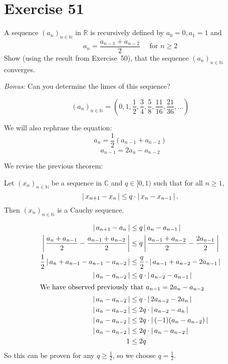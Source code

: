 \documentclass[a4paper]{article}
\theoremstyle{definition}
\newcommand\abs[1]{\left|\thinspace #1\thinspace\right|}
\newcommand\seq[1]{\left(#1\right)_{n\in\mathbb N}}
\begin{document}
\section{Exercise 51}
\begin{ex}
  A sequence $\seq{a_n}$ in $\mathbb R$ is recursively defined by $a_0 = 0, a_1 = 1$ and
  \[ a_n = \frac{a_{n-1} + a_{n-2}}{2} \quad\text{ for } n \geq 2 \]
  Show (using the result from Exercise~50), that the sequence $\seq{a_n}$ converges.

  \emph{Bonus:} Can you determine the limes of this sequence?
\end{ex}

\[ \left(a_n\right)_{n\in\mathbb N} = \left(0, 1, \frac12, \frac34, \frac58, \frac{11}{16}, \frac{21}{36}, \dots\right) \]

We will also rephrase the equation:
\[ a_n = \frac12 \left(a_{n-1} + a_{n-2}\right) \]
\[ a_{n-1} = 2a_n - a_{n-2} \]

We revise the previous theorem:

\begin{mdframed}
  Let $\seq{x_n}$ be a sequence in $\mathbb C$ and $q \in [0, 1)$ such that for all $n \geq 1$,
  \[ \abs{x_{n+1} - x_n} \leq q \cdot \abs{x_n - x_{n-1}}. \]
  Then $\seq{x_n}$ is a Cauchy sequence.
\end{mdframed}
\begin{align*}
  \abs{a_{n+1} - a_n} &\leq q \abs{a_n - a_{n-1}} \\
  \abs{\frac{a_n + a_{n-1}}{2} - \frac{a_{n-1} + a_{n-2}}{2}} &\leq q \abs{\frac{a_{n-1} + a_{n-2}}{2} - \frac{2a_{n-1}}{2}} \\
  \frac12 \abs{a_n + a_{n-1} - a_{n-1} - a_{n-2}} &\leq \frac{q}2 \cdot \abs{a_{n-1} + a_{n-2} - 2a_{n-1}} \\
  \abs{a_n - a_{n-2}} &\leq q \cdot \abs{a_{n-2} - a_{n-1}} \\
  \intertext{We have observed previously that $a_{n-1} = 2a_n - a_{n-2}$}
  \abs{a_n - a_{n-2}} &\leq q \cdot \abs{2a_{n-2} - 2a_n} \\
  \abs{a_n - a_{n-2}} &\leq 2q \cdot \abs{a_{n-2} - a_n} \\
  \abs{a_n - a_{n-2}} &\leq 2q \cdot \abs{(-1) (a_n - a_{n-2})} \\
  \abs{a_n - a_{n-2}} &\leq 2q \cdot \abs{a_n - a_{n-2}} \\
  1 &\leq 2q
\end{align*}
So this can be proven for any $q \geq \frac12$, so we choose $q = \frac12$.
\end{document}

